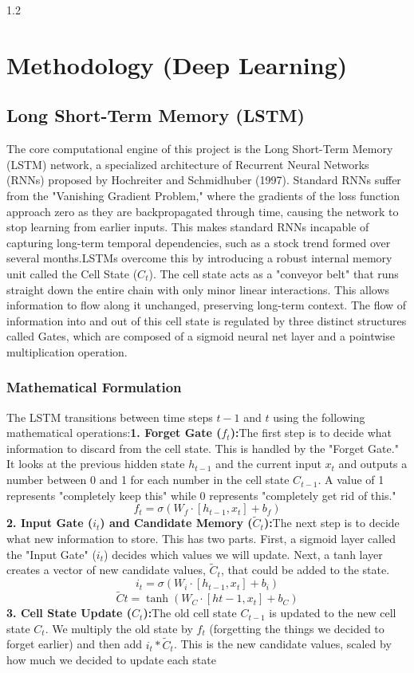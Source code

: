 \documentclass[12pt, a4paper]{report}
\begin{document}
\begin{spacing}{1.2}
\chapter{Methodology (Deep Learning)}\section{Long Short-Term Memory (LSTM)}The core computational engine of this project is the Long Short-Term Memory (LSTM) network, a specialized architecture of Recurrent Neural Networks (RNNs) proposed by Hochreiter and Schmidhuber (1997). Standard RNNs suffer from the "Vanishing Gradient Problem," where the gradients of the loss function approach zero as they are backpropagated through time, causing the network to stop learning from earlier inputs. This makes standard RNNs incapable of capturing long-term temporal dependencies, such as a stock trend formed over several months.LSTMs overcome this by introducing a robust internal memory unit called the Cell State ($C_t$). The cell state acts as a "conveyor belt" that runs straight down the entire chain with only minor linear interactions. This allows information to flow along it unchanged, preserving long-term context. The flow of information into and out of this cell state is regulated by three distinct structures called Gates, which are composed of a sigmoid neural net layer and a pointwise multiplication operation.\subsection{Mathematical Formulation}The LSTM transitions between time steps $t-1$ and $t$ using the following mathematical operations:\textbf{1. Forget Gate ($f_t$):}The first step is to decide what information to discard from the cell state. This is handled by the "Forget Gate." It looks at the previous hidden state $h_{t-1}$ and the current input $x_t$ and outputs a number between 0 and 1 for each number in the cell state $C_{t-1}$. A value of 1 represents "completely keep this" while 0 represents "completely get rid of this."\begin{equation}f_t = \sigma(W_f \cdot [h_{t-1}, x_t] + b_f)\end{equation}\textbf{2. Input Gate ($i_t$) and Candidate Memory ($\tilde{C}_t$):}The next step is to decide what new information to store. This has two parts. First, a sigmoid layer called the "Input Gate" ($i_t$) decides which values we will update. Next, a tanh layer creates a vector of new candidate values, $\tilde{C}_t$, that could be added to the state.\begin{equation}i_t = \sigma(W_i \cdot [h_{t-1}, x_t] + b_i)\end{equation}\begin{equation}\tilde{C}t = \tanh(W_C \cdot [h{t-1}, x_t] + b_C)\end{equation}\textbf{3. Cell State Update ($C_t$):}The old cell state $C_{t-1}$ is updated to the new cell state $C_t$. We multiply the old state by $f_t$ (forgetting the things we decided to forget earlier) and then add $i_t * \tilde{C}_t$. This is the new candidate values, scaled by how much we decided to update each state 
\end{spacing}
\end{document}
